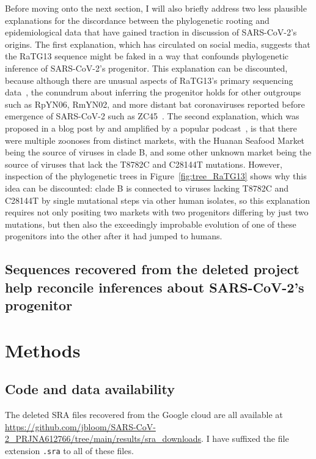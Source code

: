 \documentclass[9pt,twocolumn,twoside]{gsajnl_modified}
\begin{document}
Before moving onto the next section, I will also briefly address two less plausible explanations for the discordance between the phylogenetic rooting and epidemiological data that have gained traction in discussion of SARS-CoV-2's origins.
The first explanation, which has circulated on social media, suggests that the RaTG13 sequence might be faked in a way that confounds phylogenetic inference of SARS-CoV-2's progenitor.
This explanation can be discounted, because although there are unusual aspects of RaTG13's primary sequencing data~\citep{singla2020novo,rahalkar2020anomalous}, the conundrum about inferring the progenitor holds for other outgroups such as RpYN06, RmYN02, and more distant bat coronaviruses reported before emergence of SARS-CoV-2 such as ZC45~\citep{tang2020origin}.
The second explanation, which was proposed in a blog post by \citet{garry2021early} and amplified by a popular podcast~\citep{twiv2021}, is that there were multiple zoonoses from distinct markets, with the Huanan Seafood Market being the source of viruses in clade B, and some other unknown market being the source of viruses that lack the T8782C and C28144T mutations.
However, inspection of the phylogenetic trees in Figure~\ref{fig:tree_RaTG13} shows why this idea can be discounted: clade B is connected to viruses lacking T8782C and C28144T by single mutational steps via other human isolates, so this explanation requires not only positing two markets with two progenitors differing by just two mutations, but then also the exceedingly improbable evolution of one of these progenitors into the other after it had jumped to humans.

\subsection{Sequences recovered from the deleted project help reconcile inferences about SARS-CoV-2's progenitor}

\section{Methods}

\subsection{Code and data availability}
The deleted SRA files recovered from the Google cloud are all available at  \url{https://github.com/jbloom/SARS-CoV-2_PRJNA612766/tree/main/results/sra_downloads}.
I have suffixed the file extension \texttt{.sra} to all of these files.
\end{document}
